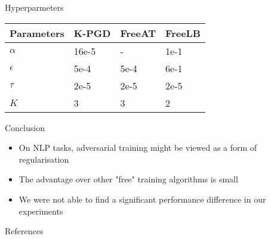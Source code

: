 \documentclass[final]{beamer}
\newlength{\onecolwid}
\begin{document}
\begin{frame}
\begin{columns}[t]
\begin{column}{\onecolwid}
\begin{exampleblock}{Hyperparmeters}
\begin{table}
\begin{tabular}{m{0.3\onecolwid}m{0.2\onecolwid}m{0.2\onecolwid}m{0.2\onecolwid}}

\toprule[5pt]
Parameters & K-PGD & FreeAT & FreeLB \\ \midrule[4pt]
$\alpha$       &   16e-5  &  -  & 1e-1    \\
$\epsilon$     &    5e-4   & 5e-4   & 6e-1    \\
$\tau$         &    2e-5   & 2e-5   & 2e-5   \\
$K$            &    3   & 3      & 2      \\ \bottomrule[5pt]

\end{tabular}
\end{table}

\end{exampleblock}


\begin{exampleblock}{Conclusion}


\begin{itemize}
\item On NLP tasks, adversarial training might be viewed as a form of regularisation
\item The advantage over other "free" training algorithms is small
\item We were not able to find a significant performance difference in our experiments
\end{itemize}

\end{exampleblock}


\begin{exampleblock}{References}

\nocite{*} %
\small{
\vspace{1cm}}
\end{exampleblock}



\end{column}
\end{columns}
\end{frame}
\end{document}
